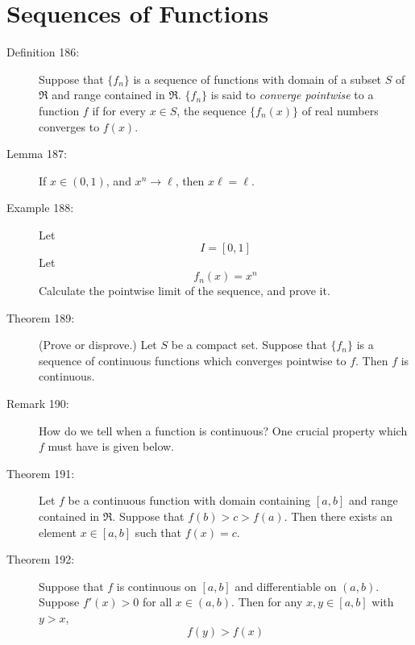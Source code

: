 \documentclass{article}
\begin{document}
\newpage

\section{Sequences of Functions}

\begin{description}

  \item[Definition 186:] Suppose that $\{ f_{n} \}$ is a sequence of functions with domain of a subset $S$ of $\Re$ and range contained in $\Re$. $\{ f_{n} \}$ is said to \emph{converge pointwise} to a function $f$ if for every $x \in S$, the sequence $\{ f_{n}(x) \}$ of real numbers converges to $f(x)$.

  \item[Lemma 187:] If $x \in (0,1)$, and $x^{n} \rightarrow \ell$, then $x \ell = \ell$.

  \item[Example 188:] Let
    \begin{equation*}
      I = [0,1]
    \end{equation*}
    Let
    \begin{equation*}
      f_{n}(x) = x^{n}
    \end{equation*}
    Calculate the pointwise limit of the sequence, and prove it. 

  \item[Theorem 189:] (Prove or disprove.) Let $S$ be a compact set. Suppose that $\{ f_{n} \}$ is a sequence of continuous functions which converges pointwise to $f$. Then $f$ is continuous. 

  \item[Remark 190:] How do we tell when a function is continuous? One crucial property which $f$ must have is given below.

  \item[Theorem 191:] Let $f$ be a continuous function with domain containing $[a,b]$ and range contained in $\Re$. Suppose that $f(b) > c > f(a)$. Then there exists an element $x \in [a,b]$ such that $f(x) = c$. 

  \item[Theorem 192:] Suppose that $f$ is continuous on $[a,b]$ and differentiable on $(a,b)$. Suppose $f' (x) > 0$ for all $x \in (a,b)$. Then for any $x,y \in [a,b]$ with $y > x$,
    \begin{equation*}
    f(y) > f(x)
    \end{equation*}


\end{description}
\end{document}
